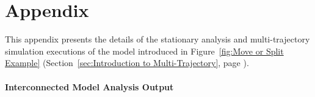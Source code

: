 

\chapter{Appendix}
\label{A. Appendix}

This appendix presents the details of the stationary analysis and multi-trajectory simulation executions of the model introduced in Figure~\ref{fig:Move or Split Example} (Section~\ref{sec:Introduction to Multi-Trajectory}, page \pageref{fig:Move or Split Example}). 


\subsubsection{Interconnected Model Analysis Output}

